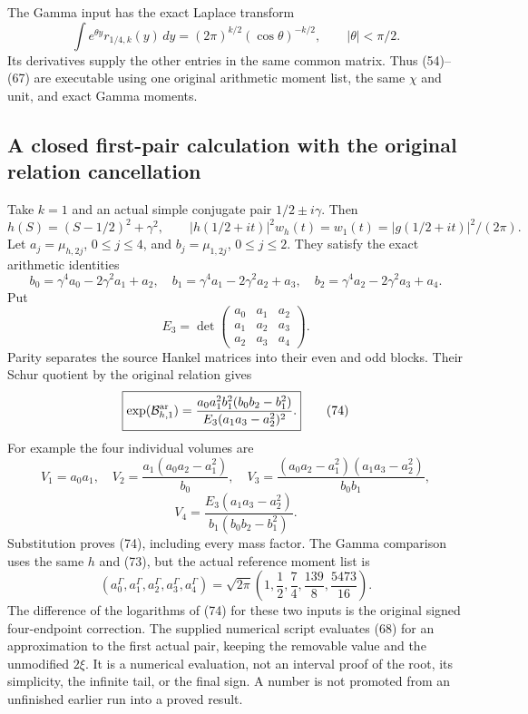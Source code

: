 \documentclass[11pt]{article}
\begin{document}
The Gamma input has the exact Laplace transform
\[
 \int e^{\theta y}r_{1/4,k}(y)\,dy
    =(2\pi)^{k/2}(\cos\theta)^{-k/2},\qquad |\theta|<\pi/2.
 \tag{71}
\]
Its derivatives supply the other entries in the same common matrix. Thus (54)--(67) are executable using one original arithmetic moment list, the same $\chi$ and unit, and exact Gamma moments.

\subsection{A closed first-pair calculation with the original relation cancellation}
Take $k=1$ and an actual simple conjugate pair $1/2\pm i\gamma$. Then
\[
 h(S)=(S-1/2)^2+\gamma^2,\qquad
 |h(1/2+it)|^2w_h(t)=w_1(t)=|g(1/2+it)|^2/(2\pi).
 \tag{72}
\]
Let $a_j=\mu_{h,2j}$, $0\le j\le4$, and $b_j=\mu_{1,2j}$, $0\le j\le2$. They satisfy the exact arithmetic identities
\[
 b_0=\gamma^4a_0-2\gamma^2a_1+a_2,
 \quad b_1=\gamma^4a_1-2\gamma^2a_2+a_3,
 \quad b_2=\gamma^4a_2-2\gamma^2a_3+a_4.
 \tag{73}
\]
Put
\[
 E_3=\det\begin{pmatrix}a_0&a_1&a_2\\a_1&a_2&a_3\\a_2&a_3&a_4\end{pmatrix}.
\]
Parity separates the source Hankel matrices into their even and odd blocks. Their Schur quotient by the original relation gives
\[
 \boxed{\exp(\mathcal B^{\rm ar}_{h,1})
 =\frac{a_0a_1^2b_1^2(b_0b_2-b_1^2)}
              {E_3(a_1a_3-a_2^2)^2}.}
 \tag{74}
\]
For example the four individual volumes are
\[
 V_1=a_0a_1,\quad
 V_2=\frac{a_1(a_0a_2-a_1^2)}{b_0},\quad
 V_3=\frac{(a_0a_2-a_1^2)(a_1a_3-a_2^2)}{b_0b_1},
\]
\[
 V_4=\frac{E_3(a_1a_3-a_2^2)}{b_1(b_0b_2-b_1^2)}.
 \tag{75}
\]
Substitution proves (74), including every mass factor. The Gamma comparison uses the same $h$ and (73), but the actual reference moment list is
\[
 (a_0^\Gamma,a_1^\Gamma,a_2^\Gamma,a_3^\Gamma,a_4^\Gamma)
 =\sqrt{2\pi}\left(1,\frac12,\frac74,\frac{139}{8},\frac{5473}{16}\right).
 \tag{76}
\]
The difference of the logarithms of (74) for these two inputs is the original signed four-endpoint correction. The supplied numerical script evaluates (68) for an approximation to the first actual pair, keeping the removable value and the unmodified $2\xi$. It is a numerical evaluation, not an interval proof of the root, its simplicity, the infinite tail, or the final sign. A number is not promoted from an unfinished earlier run into a proved result.
\end{document}
